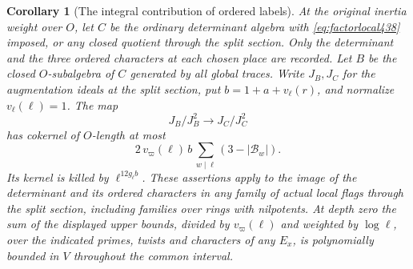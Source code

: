 \documentclass[a4paper,11pt]{article}
\newtheorem{corollary}[proposition]{Corollary}
\theoremstyle{definition}
\theoremstyle{remark}
\numberwithin{equation}{section}
\begin{document}
\begin{corollary}[The integral contribution of ordered labels]\leavevmode
\label{cor:flagcotangent438}
At the original inertia weight over \(O\), let \(C\) be the
ordinary determinant algebra with \eqref{eq:factorlocal438}
imposed, or any closed quotient through the split section.
Only the determinant and the three ordered characters at
each chosen place are recorded. Let \(B\) be the closed
\(O\)-subalgebra of \(C\) generated by all global traces.
Write \(J_B,J_C\) for the augmentation ideals at the split
section, put \(b=1+a+v_\ell(r)\), and normalize \(v_\ell(\ell)=1\).
The map
\[
              J_B/J_B^2\longrightarrow J_C/J_C^2
\]
has cokernel of \(O\)-length at most
\[
  2\,v_\varpi(\ell)\, b\,
       \sum_{w\mid\ell}(3-|\mathcal B_w|).
\]
Its kernel is killed by \(\ell^{12g_\ell b}\).
These assertions apply to the image of the determinant and
its ordered characters in any family of actual local flags
through the split section, including families over rings with
nilpotents. At depth zero the sum of the displayed upper
bounds, divided by \(v_\varpi(\ell)\) and weighted by
\(\log\ell\), over the indicated primes, twists and characters
of any \(E_x\), is polynomially bounded in \(V\) throughout
the common interval.
\end{corollary}
\end{document}
